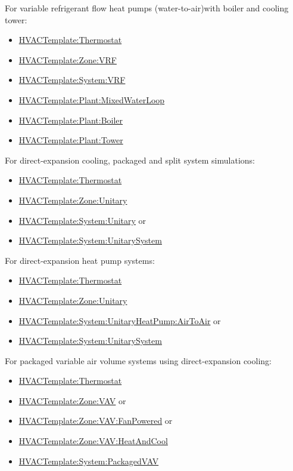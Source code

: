 For variable refrigerant flow heat pumps (water-to-air)with boiler and cooling tower:

\begin{itemize}
\item
  \hyperref[hvactemplatethermostat]{HVACTemplate:Thermostat}
\item
  \hyperref[hvactemplatezonevrf]{HVACTemplate:Zone:VRF}
\item
  \hyperref[hvactemplatesystemvrf]{HVACTemplate:System:VRF}
\item
  \hyperref[hvactemplateplantmixedwaterloop]{HVACTemplate:Plant:MixedWaterLoop}
\item
  \hyperref[hvactemplateplantboiler]{HVACTemplate:Plant:Boiler}
\item
  \hyperref[hvactemplateplanttower]{HVACTemplate:Plant:Tower}
\end{itemize}

For direct-expansion cooling, packaged and split system simulations:

\begin{itemize}
\item
  \hyperref[hvactemplatethermostat]{HVACTemplate:Thermostat}
\item
  \hyperref[hvactemplatezoneunitary]{HVACTemplate:Zone:Unitary}
\item
  \hyperref[hvactemplatesystemunitary]{HVACTemplate:System:Unitary} or
\item
  \hyperref[hvactemplatesystemunitarysystem]{HVACTemplate:System:UnitarySystem}
\end{itemize}

For direct-expansion heat pump systems:

\begin{itemize}
\item
  \hyperref[hvactemplatethermostat]{HVACTemplate:Thermostat}
\item
  \hyperref[hvactemplatezoneunitary]{HVACTemplate:Zone:Unitary}
\item
  \hyperref[hvactemplatesystemunitaryheatpumpairtoair]{HVACTemplate:System:UnitaryHeatPump:AirToAir} or
\item
  \hyperref[hvactemplatesystemunitarysystem]{HVACTemplate:System:UnitarySystem}
\end{itemize}

For packaged variable air volume systems using direct-expansion cooling:

\begin{itemize}
\item
  \hyperref[hvactemplatethermostat]{HVACTemplate:Thermostat}
\item
  \hyperref[hvactemplatezonevav]{HVACTemplate:Zone:VAV} or
\item
  \hyperref[hvactemplatezonevavfanpowered]{HVACTemplate:Zone:VAV:FanPowered} or
\item
  \hyperref[hvactemplatezonevavheatandcool]{HVACTemplate:Zone:VAV:HeatAndCool}
\item
  \hyperref[hvactemplatesystempackagedvav]{HVACTemplate:System:PackagedVAV}
\end{itemize}

